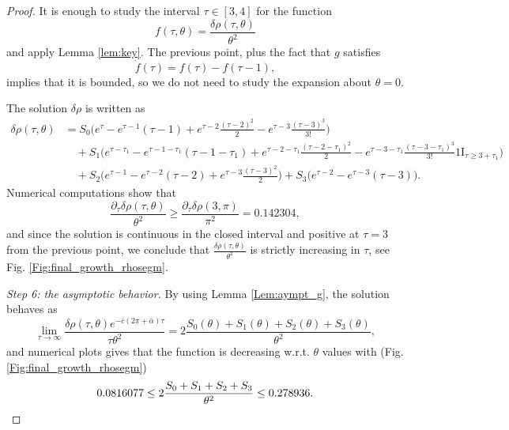 \documentclass[reqno]{amsart}
\theoremstyle{definition} \newtheorem{definition}{Definition}[section]
\theoremstyle{definition} \newtheorem{remark}[definition]{Remark}
\theoremstyle{plain} \newtheorem{lemma}[definition]{Lemma}
\theoremstyle{plain} \newtheorem{proposition}[definition]{Proposition}
\theoremstyle{plain} \newtheorem{theorem}[definition]{Theorem}
\theoremstyle{plain} \newtheorem{corollary}[definition]{Corollary}
\theoremstyle{definition} \newtheorem{example}[definition]{Example}
\theoremstyle{plain} \newtheorem{claim}[clai]{Claim}
\theoremstyle{definition} \newtheorem{assumption}[definition]{Assumption}
\theoremstyle{definition} \newtheorem{observation}[definition]{Observation}
\newcommand{\ind}{1\!\!\mathrm{I}}
\newcommand{\1}{\mathbbm 1}
\numberwithin{equation}{section} %
\theoremstyle{plain} \newtheorem*{theorem*}{Theorem}
\theoremstyle{plain} \newtheorem{mthm}[maintheorem]{Main Theorem}
\theoremstyle{plain} \newtheorem*{mthm*}{Main Theorem}
\theoremstyle{plain} \newtheorem*{conjecture*}{Conjecture}
\theoremstyle{plain} \newtheorem{conjecture}[definition]{Conjecture}
\theoremstyle{plain} \newtheorem*{problem*}{Problem}
\begin{document}
\begin{proof}
\noindent It is enough to study the interval $\tau \in [3,4]$ for the function
\begin{equation}
\label{Equa:f_increas_segm}
f(\tau,\theta) = \frac{\delta \rho(\tau,\theta)}{\theta^2}
\end{equation}
and apply Lemma \ref{lem:key}. The previous point, plus the fact that $g$ satisfies
\begin{equation*}
\dot f(\tau) = f(\tau) - f(\tau -1),
\end{equation*}
implies that it is bounded, so we do not need to study the expansion about $\theta = 0$.

The solution $\delta \rho$ is written as
\begin{align*}
\delta \rho(\tau,\theta) &= S_0 \bigg( e^\tau - e^{\tau - 1} (\tau-1) + e^{\tau-2} \frac{(\tau-2)^2}{2} - e^{\tau-3} \frac{(\tau-3)^3}{3!} \bigg) \\
& \quad + S_1 \bigg( e^{\tau - \tau_1} - e^{\tau - 1 - \tau_1} (\tau - 1 - \tau_1) + e^{\tau - 2 - \tau_1} \frac{(\tau - 2 - \tau_1)^2}{2} - e^{\tau - 3 - \tau_1} \frac{(\tau - 3 - \tau_1)^3}{3!} \ind_{\tau \geq 3 + \tau_1} \bigg) \\
&\quad + S_2 \bigg( e^{\tau-1} - e^{\tau-2} (\tau-2) + e^{\tau-3} \frac{(\tau-3)^2}{2} \bigg) + S_3 \big( e^{\tau-2} - e^{\tau-3} (\tau-3) \big).
\end{align*}
Numerical computations show that
\begin{equation*}
\frac{\partial_\tau \delta \rho(\tau,\theta)}{\theta^2} \geq \frac{\partial_\tau \delta \rho(3,\pi)}{\pi^2} = 0.142304,
\end{equation*}
and since the solution is continuous in the closed interval and positive at $\tau = 3$ from the previous point, we conclude that $\frac{\delta \rho(\tau,\theta)}{\theta^2}$ is strictly increasing in $\tau$, see Fig. \ref{Fig:final_growth_rhosegm}.

\medskip

{\it Step 6: the asymptotic behavior.} By using Lemma \ref{Lem:aympt_g}, the solution behaves as
\begin{equation}
\label{Equa:asympt_segm}
\lim_{\tau \to \infty} \frac{\delta \rho(\tau,\theta) e^{-\bar c(2\pi + \bar \alpha) \tau}}{\tau \theta^2} = 2 \frac{S_0(\theta) + S_1(\theta) + S_2(\theta) + S_3(\theta)}{\theta^2},
\end{equation}
and numerical plots gives that the function is decreasing w.r.t. $\theta$ values with (Fig. \ref{Fig:final_growth_rhosegm})
\begin{equation*}
0.0816077 \leq 2 \frac{S_0 + S_1 + S_2 + S_3}{\theta^2} \leq 0.278936. \qedhere
\end{equation*}
\end{proof}
\end{document}
